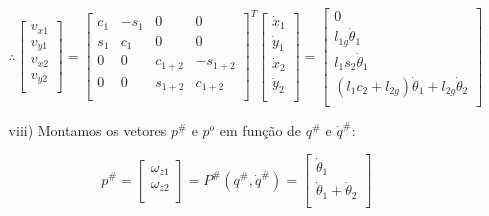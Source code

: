 \documentclass[12pt,a4paper]{article}
\begin{document}
\begin{itemize}
\begin{itemize}
	
	\begin{equation}
	\therefore
	\begin{bmatrix}
	v_{x1} \\
	v_{y1} \\
	v_{x2} \\
	v_{y2} \\
	\end{bmatrix}
	=
	\begin{bmatrix}
	c_1 & -s_1 & 0 & 0 \\
	s_1 & c_1 & 0 & 0 \\
	0 & 0 & c_{1+2} & -s_{1+2} \\
	0 & 0 & s_{1+2} & c_{1+2} \\
	\end{bmatrix}^T
	\begin{bmatrix}
	\dot{x}_1 \\
	\dot{y}_1 \\	
	\dot{x}_2 \\
	\dot{y}_2 \\	
	\end{bmatrix}
	=
	\begin{bmatrix}
	0 \\
	l_{1g} \dot{\theta}_1 \\
	l_1 s_2 \dot{\theta}_1\\
	(l_1 c_2 + l_{2g} )\dot{\theta}_1 + l_{2g} \dot{\theta}_2 \\
	\end{bmatrix}
	\end{equation}
	
	\item[viii)] Montamos os vetores $p^{\#}$ e $p^o$ em função de $q^{\#}$ e $\dot{q}^{\#}$:

	\begin{equation}
	p^{\#} = 
	\begin{bmatrix}
	\omega_{z1} \\
	\omega_{z2} \\
	\end{bmatrix}
	= P^{\#} (q^{\#}, \dot{q}^{\#} ) =
	\begin{bmatrix}
	\dot{\theta}_1 \\
	\dot{\theta}_1 +\dot{\theta}_2 \\
	\end{bmatrix}
	\end{equation}
	

\end{itemize}
\end{itemize}
\end{document}
